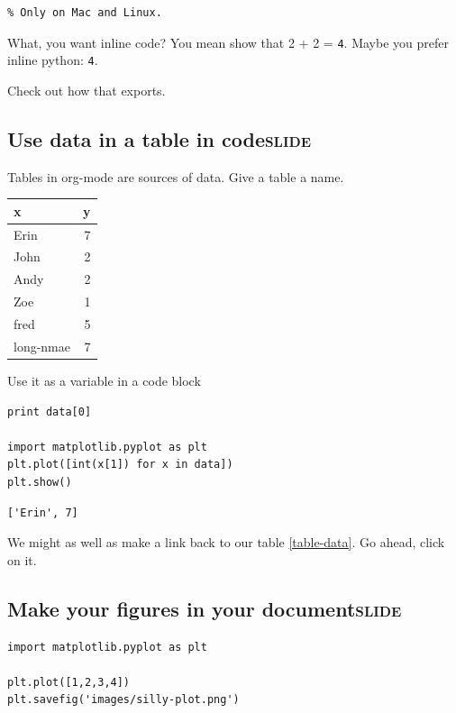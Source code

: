 \documentclass[11pt]{article}
\begin{document}
\begin{verbatim}
% Only on Mac and Linux.
\end{verbatim}

What, you want inline code? You mean show that 2 + 2 = \texttt{4}. Maybe you prefer inline python: \texttt{4}.

Check out how that exports.

\subsection{Use data in a table in code\hfill{}\textsc{slide}}
\label{sec-11-2}

Tables in org-mode are sources of data. Give a table a name.

\begin{center}
\begin{tabular}{lr}
x & y\\
\hline
Erin & 7\\
John & 2\\
Andy & 2\\
Zoe & 1\\
fred & 5\\
long-nmae & 7\\
\end{tabular}
\end{center}


Use it as a variable in a code block

\begin{verbatim}
print data[0]

import matplotlib.pyplot as plt
plt.plot([int(x[1]) for x in data])
plt.show()
\end{verbatim}

\begin{verbatim}
['Erin', 7]
\end{verbatim}


We might as well as make a link back to our table \ref{table-data}. Go ahead, click on it.

\subsection{Make your figures in your document\hfill{}\textsc{slide}}
\label{sec-11-3}

\begin{verbatim}
import matplotlib.pyplot as plt

plt.plot([1,2,3,4])
plt.savefig('images/silly-plot.png')
\end{verbatim}
\end{document}
